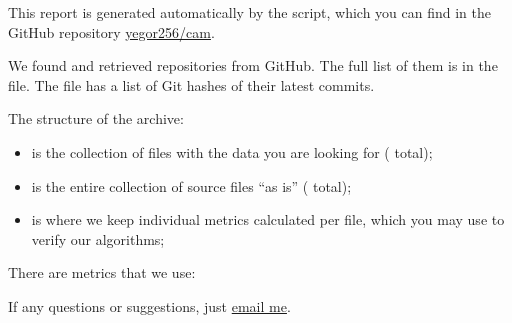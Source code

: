 \documentclass[nobrand,nosecurity]{huawei}
\begin{document}
\maketitle

This report is generated automatically by the script, which you can find in
the GitHub repository \href{https://github.com/yegor256/cam}{yegor256/cam}.

We found and retrieved 
repositories from GitHub.
The full list of them is in the  file.
The  file has a list of Git hashes of their latest commits.


The structure of the archive:

\begin{itemize}
  \item {} is the collection of  files with the data
  you are looking for ( total);

  \item {} is the entire collection of
  source files ``as is''
  ( total);

  \item {} is where we keep individual metrics calculated
  per file, which you may use to verify our algorithms;
\end{itemize}

There are  metrics that we use:

\begin{itemize}
  
\end{itemize}

If any questions or suggestions, just \href{mailto:yegor256@gmail.com}{email me}.
\end{document}

